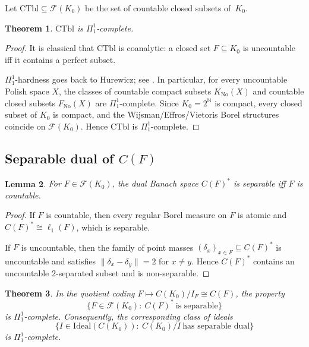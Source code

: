 \documentclass[12pt,fleqn,a4paper]{amsart}
\numberwithin{equation}{section}
\newtheorem{theorem}{Theorem}[section]
\newtheorem{lemma}[theorem]{Lemma}
\theoremstyle{definition}
\newcommand{\N}{\mathbb{N}}
\newcommand{\Ideal}{\mathrm{Ideal}}
\newcommand{\CTbl}{\mathrm{CTbl}}
\begin{document}
Let $\CTbl\subseteq\mathscr F(K_0)$ be the set of countable closed subsets
of~$K_0$.

\begin{theorem}\label{thm:countable-closed-Pi11}
$\CTbl$ is $\Pi^1_1$-complete.
\end{theorem}

\begin{proof}
It is classical that $\CTbl$ is coanalytic: a closed set $F\subseteq K_0$ is
uncountable iff it contains a perfect subset.

$\Pi^1_1$-hardness goes back to Hurewicz; see
\cite[Theorem~27.5 and Section~33.B]{Kechris}.  In particular, for every
uncountable Polish space $X$, the classes of countable compact subsets
$K_{\mathrm{No}}(X)$ and countable closed subsets $F_{\mathrm{No}}(X)$ are
$\Pi^1_1$-complete.  Since $K_0=2^\N$ is compact, every closed subset of $K_0$
is compact, and the Wijsman/Effros/Vietoris Borel structures coincide on
$\mathscr F(K_0)$.  Hence $\CTbl$ is $\Pi^1_1$-complete.
\end{proof}

\subsection{Separable dual of \texorpdfstring{$C(F)$}{C(F)}}

\begin{lemma}\label{lem:CF-dual-separable}
For $F\in\mathscr F(K_0)$, the dual Banach space $C(F)^*$ is separable iff $F$ is
countable.
\end{lemma}

\begin{proof}
If $F$ is countable, then every regular Borel measure on $F$ is atomic and
$C(F)^*\cong \ell_1(F)$, which is separable.

If $F$ is uncountable, then the family of point masses $(\delta_x)_{x\in F}\subseteq C(F)^*$
is uncountable and satisfies $\|\delta_x-\delta_y\|=2$ for $x\neq y$.
Hence $C(F)^*$ contains an uncountable $2$-separated subset and is non-separable.
\end{proof}

\begin{theorem}\label{thm:dual-separable-Pi11}
In the quotient coding $F\mapsto C(K_0)/I_F\cong C(F)$, the property
\[
\{F\in\mathscr F(K_0):\ C(F)^*\ \text{is separable}\}
\]
is $\Pi^1_1$-complete.  Consequently, the corresponding class of ideals
\[
\{I\in\Ideal(C(K_0)):\ C(K_0)/I\ \text{has separable dual}\}
\]
is $\Pi^1_1$-complete.
\end{theorem}
\end{document}
